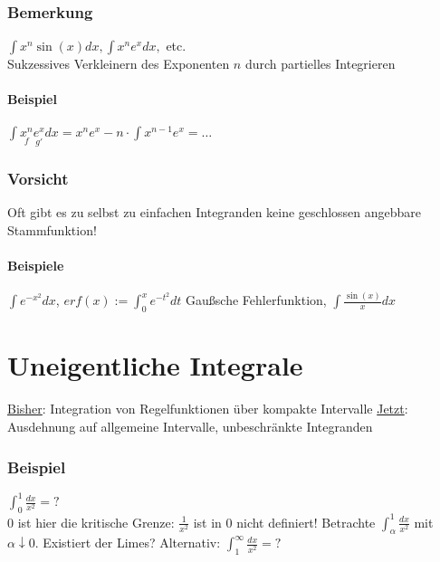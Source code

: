 \subsection*{Bemerkung}
$\int x^n \sin(x) dx, \int x^n e^x dx,$ etc.\\
Sukzessives Verkleinern des Exponenten $n$ durch partielles Integrieren

\subsubsection*{Beispiel}
$\int \underset{f}{x^n} \underset{g'}{e^x} dx = x^n e^x - n \cdot \int x^{n-1} e^x = \ldots$

\subsection*{Vorsicht}
Oft gibt es zu selbst zu einfachen Integranden keine geschlossen angebbare Stammfunktion!

\subsubsection*{Beispiele}
$\int e^{-x^2} dx$, $erf(x) := \int_0^x e^{-t^2} dt$ Gaußsche Fehlerfunktion, $\int \frac{\sin(x)}{x} dx$

{}
\chapter*{Uneigentliche Integrale}\label{UneigentlicheIntegrale}
\underline{Bisher}: Integration von Regelfunktionen über kompakte Intervalle\nl
\underline{Jetzt}: Ausdehnung auf allgemeine Intervalle, unbeschränkte Integranden

\subsection*{Beispiel}
$\int_0^1 \frac{dx}{x^2}=?$\\
$0$ ist hier die kritische Grenze: $\frac{1}{x^2}$ ist in $0$ nicht definiert!\nl
Betrachte $\int_\alpha^1 \frac{dx}{x^2}$ mit $\alpha \downarrow 0$. Existiert der Limes?\nl
Alternativ: $\int_1^\infty \frac{dx}{x^2}=?$\nl


